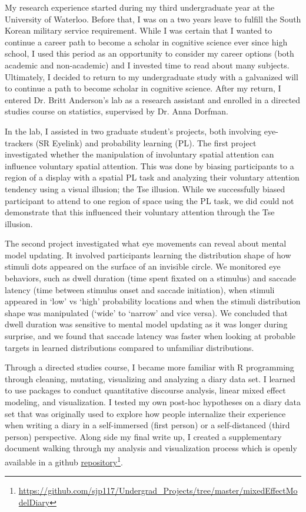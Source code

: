 \documentclass[12pt]{article}
\begin{document}
	My research experience started during my third undergraduate year at the University of Waterloo. Before that, I was on a two years leave to fulfill the South Korean military service requirement. While I was certain that I wanted to continue a career path to become a scholar in cognitive science ever since high school, I used this period as an opportunity to consider my career options (both academic and non-academic) and I invested time to read about many subjects. Ultimately, I decided to return to my undergraduate study with a galvanized will to continue a path to become scholar in cognitive science. After my return, I entered Dr. Britt Anderson's lab as a research assistant and enrolled in a directed studies course on statistics, supervised by Dr. Anna Dorfman.

	In the lab, I assisted in two graduate student's projects, both involving eye-trackers (SR Eyelink) and probability learning (PL). The first project investigated whether the manipulation of involuntary spatial attention can influence voluntary spatial attention. This was done by biasing participants to a region of a display with a spatial PL task and analyzing their voluntary attention tendency using a visual illusion; the Tse illusion. While we successfully biased participant to attend to one region of space using the PL task, we did could not demonstrate that this influenced their voluntary attention through the Tse illusion.

	The second project investigated what eye movements can reveal about mental model updating. It involved participants learning the distribution shape of how stimuli dots appeared on the surface of an invisible circle. We monitored eye behaviors, such as dwell duration (time spent fixated on a stimulus) and saccade latency (time between stimulus onset and saccade initiation), when stimuli appeared in `low' vs `high' probability locations and when the stimuli distribution shape was manipulated (`wide' to `narrow' and vice versa). We concluded that dwell duration was sensitive to mental model updating as it was longer during surprise, and we found that saccade latency was faster when looking at probable targets in learned distributions compared to unfamiliar distributions.

	Through a directed studies course, I became more familiar with R programming through cleaning, mutating, visualizing and analyzing a diary data set. I learned to use packages to conduct quantitative discourse analysis, linear mixed effect modeling, and visualization. I tested my own post-hoc hypotheses on a diary data set that was originally used to explore how people internalize their experience when writing a diary in a self-immersed (first person) or a self-distanced (third person) perspective. Along side my final write up, I created a supplementary document walking through my analysis and visualization process which is openly available in a github \href{https://github.com/sjp117/Undergrad_Projects/tree/master/mixedEffectModelDiary}{repository}\footnote{\url{https://github.com/sjp117/Undergrad\_Projects/tree/master/mixedEffectModelDiary}}.
	
\end{document}
